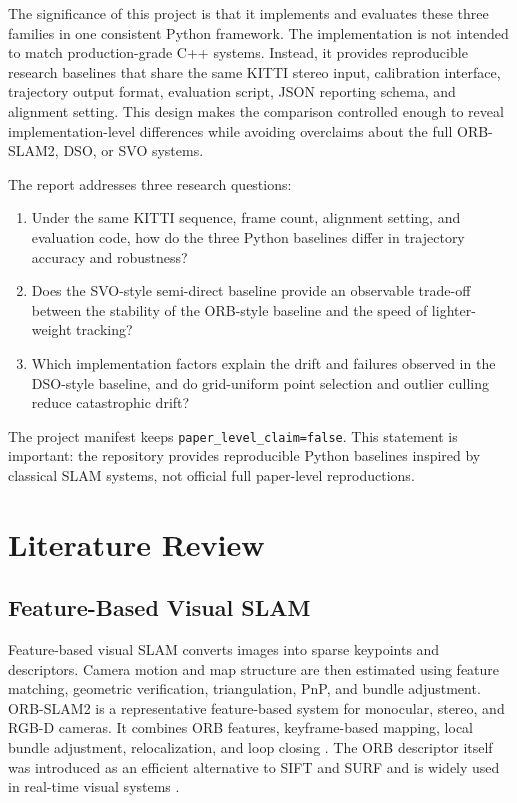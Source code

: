 \documentclass[11pt,a4paper]{article}
\newcommand{\paperclaim}{\texttt{paper\_level\_claim=false}}
\begin{document}
The significance of this project is that it implements and evaluates these three families in one consistent Python framework. The implementation is not intended to match production-grade C++ systems. Instead, it provides reproducible research baselines that share the same KITTI stereo input, calibration interface, trajectory output format, evaluation script, JSON reporting schema, and alignment setting. This design makes the comparison controlled enough to reveal implementation-level differences while avoiding overclaims about the full ORB-SLAM2, DSO, or SVO systems.

The report addresses three research questions:
\begin{enumerate}[leftmargin=2em]
  \item Under the same KITTI sequence, frame count, alignment setting, and evaluation code, how do the three Python baselines differ in trajectory accuracy and robustness?
  \item Does the SVO-style semi-direct baseline provide an observable trade-off between the stability of the ORB-style baseline and the speed of lighter-weight tracking?
  \item Which implementation factors explain the drift and failures observed in the DSO-style baseline, and do grid-uniform point selection and outlier culling reduce catastrophic drift?
\end{enumerate}

The project manifest keeps \paperclaim{}. This statement is important: the repository provides reproducible Python baselines inspired by classical SLAM systems, not official full paper-level reproductions.

\section{Literature Review}

\subsection{Feature-Based Visual SLAM}

Feature-based visual SLAM converts images into sparse keypoints and descriptors. Camera motion and map structure are then estimated using feature matching, geometric verification, triangulation, PnP, and bundle adjustment. ORB-SLAM2 is a representative feature-based system for monocular, stereo, and RGB-D cameras. It combines ORB features, keyframe-based mapping, local bundle adjustment, relocalization, and loop closing \cite{mur2017orbslam2}. The ORB descriptor itself was introduced as an efficient alternative to SIFT and SURF and is widely used in real-time visual systems \cite{rublee2011orb}.
\end{document}
